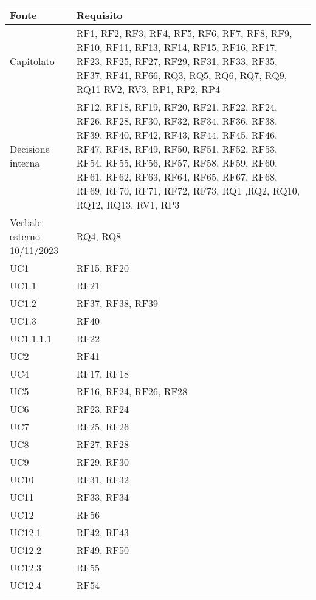 \begin{center}
    \begin{longtable}{|C{5cm}|C{5cm}|}
        \hline
        \textbf{Fonte} & \textbf{Requisito} \\
        \hline
        Capitolato & RF1, RF2, RF3, RF4, RF5, RF6, RF7, RF8, RF9, RF10, RF11, RF13, RF14, RF15, RF16, RF17, RF23, RF25, RF27, RF29, RF31, RF33, RF35, RF37, RF41, RF66, RQ3, RQ5, RQ6, RQ7, RQ9, RQ11 RV2, RV3, RP1, RP2, RP4  \\
        \hline
        Decisione interna & RF12, RF18, RF19, RF20, RF21, RF22, RF24, RF26, RF28, RF30, RF32, RF34, RF36, RF38, RF39, RF40, RF42, RF43, RF44, RF45, RF46, RF47, RF48, RF49, RF50, RF51, RF52, RF53, RF54, RF55, RF56, RF57, RF58, RF59, RF60, RF61, RF62, RF63, RF64, RF65, RF67, RF68, RF69, RF70, RF71, RF72, RF73, RQ1 ,RQ2, RQ10, RQ12, RQ13, RV1, RP3 \\
        \hline
        Verbale esterno 10/11/2023 & RQ4, RQ8 \\
        \hline
        UC1 & RF15, RF20 \\
        \hline
        UC1.1 & RF21 \\
        \hline
        UC1.2 & RF37, RF38, RF39 \\
        \hline
        UC1.3 & RF40 \\
        \hline
        UC1.1.1.1 & RF22 \\
        \hline
        UC2 & RF41 \\
        \hline
        UC4 & RF17, RF18 \\
        \hline
        UC5 & RF16, RF24, RF26, RF28 \\
        \hline
        UC6 & RF23, RF24 \\
        \hline
        UC7 & RF25, RF26 \\
        \hline
        UC8 & RF27, RF28 \\
        \hline
        UC9 & RF29, RF30 \\
        \hline
        UC10 & RF31, RF32 \\
        \hline
        UC11 & RF33, RF34 \\
        \hline
        UC12 & RF56 \\
        \hline
        UC12.1 & RF42, RF43 \\
        \hline
        UC12.2 & RF49, RF50 \\
        \hline
        UC12.3 & RF55 \\
        \hline
        UC12.4 & RF54 \\

\end{longtable}
\end{center}
